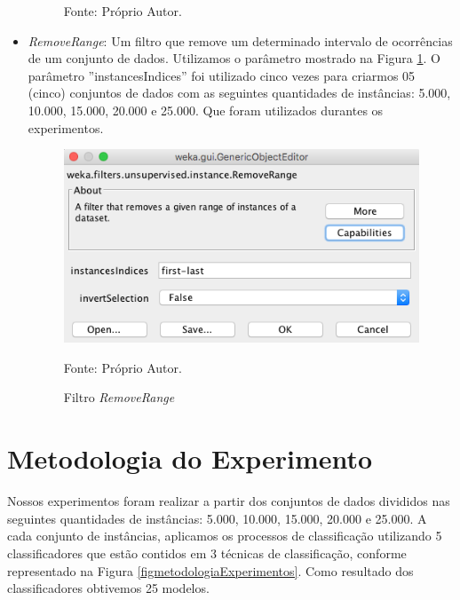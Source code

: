 \documentclass[
	12pt,				%
	openright,			%
	oneside,	
	a4paper,				%
	english,				%
	brazil				%
]{abntex2/abntex2} %
\begin{document}
\begin{itemize}
\begin{figure}[!h]
\begin{center}
				\end{center}
				\centering Fonte: Próprio Autor.
			\end{figure}
			\newpage
			\item \textit{RemoveRange}: Um filtro que remove um determinado intervalo de ocorrências de um conjunto de dados. Utilizamos o parâmetro mostrado na Figura \ref{figfiltroRemoveRange}. O parâmetro ''instancesIndices''  foi utilizado cinco vezes para criarmos 05 (cinco) conjuntos de dados com as seguintes quantidades de instâncias: 5.000, 10.000, 15.000, 20.000 e 25.000. Que foram utilizados durantes os experimentos.
			\begin{figure}[!h]
					\caption{\label{figfiltroRemoveRange} Filtro \textit{RemoveRange}}
				\begin{center}
					\includegraphics[scale=0.45]{img/filtroRemoveRange.png}
				\end{center}
			\centering Fonte: Próprio Autor.
			\end{figure}
		\end{itemize}

		
	\section{Metodologia do Experimento}
	
	Nossos experimentos foram realizar a partir dos conjuntos de dados divididos nas seguintes quantidades de instâncias: 5.000, 10.000, 15.000, 20.000 e 25.000. A cada conjunto de instâncias, aplicamos os processos de classificação utilizando 5 classificadores que estão contidos em 3 técnicas de classificação, conforme representado na Figura \ref{figmetodologiaExperimentos}. Como resultado dos classificadores obtivemos 25 modelos. 
	
\end{document}
